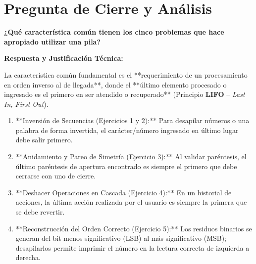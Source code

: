 \documentclass[11pt, a4paper]{article}
\begin{document}
\section*{Pregunta de Cierre y Análisis}

\begin{tcolorbox}[colback=codeBg, colframe=brandBlue, arc=3mm, width=\textwidth, boxrule=1.2pt]
    \textbf{\Large ¿Qué característica común tienen los cinco problemas que hace apropiado utilizar una pila?}
\end{tcolorbox}

\vspace{0.4cm}

\textbf{Respuesta y Justificación Técnica:}

La característica común fundamental es el **requerimiento de un procesamiento en orden inverso al de llegada**, donde el **último elemento procesado o ingresado es el primero en ser atendido o recuperado** (Principio \textbf{LIFO} -- \textit{Last In, First Out}).

\begin{enumerate}\setlength{\itemsep}{6pt}
 \item **Inversión de Secuencias (Ejercicios 1 y 2):** Para desapilar números o una palabra de forma invertida, el carácter/número ingresado en último lugar debe salir primero.
    \item **Anidamiento y Pareo de Simetría (Ejercicio 3):** Al validar paréntesis, el último paréntesis de apertura encontrado es siempre el primero que debe cerrarse con uno de cierre.
    \item **Deshacer Operaciones en Cascada (Ejercicio 4):** En un historial de acciones, la última acción realizada por el usuario es siempre la primera que se debe revertir.
    \item **Reconstrucción del Orden Correcto (Ejercicio 5):** Los residuos binarios se generan del bit menos significativo (LSB) al más significativo (MSB); desapilarlos permite imprimir el número en la lectura correcta de izquierda a derecha.
\end{enumerate}
\end{document}

